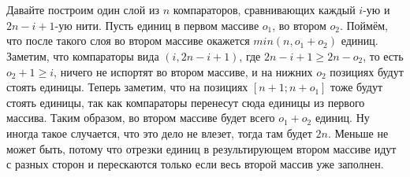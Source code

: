 \section{}
	Давайте построим один слой из $n$ компараторов, сравнивающих каждый $i$-ую и $2n - i + 1$-ую нити. Пусть единиц в первом массиве $o_1$, во втором $o_2$. Поймём, что после такого слоя во втором массиве окажется $min(n, o_1+o_2)$ единиц. Заметим, что компараторы вида $(i, 2n - i + 1)$, где $2n - i + 1 \geq 2n - o_2$, то есть $o_2 + 1 \geq i$, ничего не испортят во втором массиве, и на нижних $o_2$ позициях будут стоять единицы. Теперь заметим, что на позициях $[n + 1; n + o_1]$ тоже будут стоять единицы, так как компараторы перенесут сюда единицы из первого массива. Таким образом, во втором массиве будет всего $o_1 + o_2$ единиц. Ну иногда такое случается, что это дело не влезет, тогда там будет $2n$. Меньше не может быть, потому что отрезки единиц в результирующем втором массиве идут с разных сторон и перескаются только если весь второй массив уже заполнен.